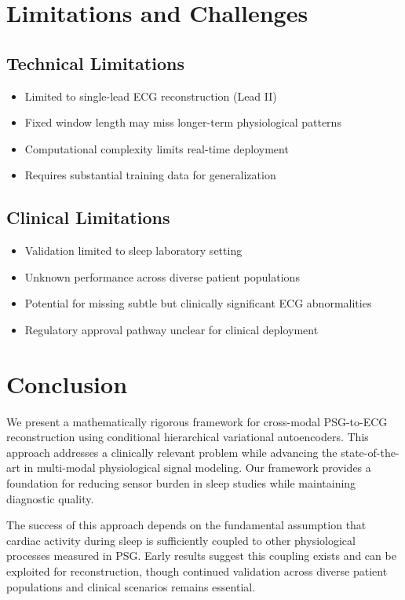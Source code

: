 \documentclass[11pt]{article}
\begin{document}
\section{Limitations and Challenges}

\subsection{Technical Limitations}

\begin{itemize}
\item Limited to single-lead ECG reconstruction (Lead II)
\item Fixed window length may miss longer-term physiological patterns
\item Computational complexity limits real-time deployment
\item Requires substantial training data for generalization
\end{itemize}

\subsection{Clinical Limitations}

\begin{itemize}
\item Validation limited to sleep laboratory setting
\item Unknown performance across diverse patient populations
\item Potential for missing subtle but clinically significant ECG abnormalities
\item Regulatory approval pathway unclear for clinical deployment
\end{itemize}

\section{Conclusion}

We present a mathematically rigorous framework for cross-modal PSG-to-ECG reconstruction using conditional hierarchical variational autoencoders. This approach addresses a clinically relevant problem while advancing the state-of-the-art in multi-modal physiological signal modeling. Our framework provides a foundation for reducing sensor burden in sleep studies while maintaining diagnostic quality.

The success of this approach depends on the fundamental assumption that cardiac activity during sleep is sufficiently coupled to other physiological processes measured in PSG. Early results suggest this coupling exists and can be exploited for reconstruction, though continued validation across diverse patient populations and clinical scenarios remains essential.
\end{document}
